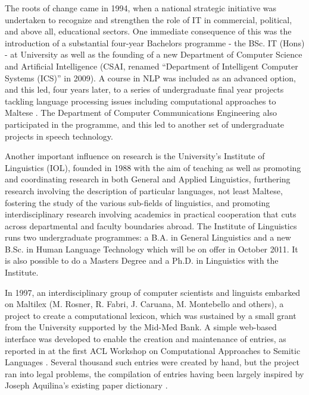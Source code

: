 \documentclass[]{../../metanetpaper}
\begin{document}
\begin{multicols}{2}
The roots of change came in 1994, when a national strategic initiative was undertaken to recognize and strengthen the role of IT in commercial, political, and above all, educational sectors. One immediate consequence of this was the introduction of a substantial four-year Bachelors programme - the BSc. IT (Hons) - at University as well as the founding of a new Department of Computer Science and Artificial Intelligence (CSAI, renamed ``Department of Intelligent Computer Systems (ICS)'' in 2009). A course in NLP was included as an advanced option, and this led, four years later, to a series of undergraduate final year projects tackling language processing issues including computational approaches to Maltese \cite{Galea:1999, Mangion:1999, Farrugia:1999, Farrugia:2000, Mizzi:2000, Bajada:2004, Attard:2005, Farrugia:2008, Farrugia:2009, Vella:2010}. The Department of Computer Communications Engineering also participated in the programme, and this led to another set of undergraduate projects in speech technology.

Another important influence on research is the University’s Institute of Linguistics (IOL), founded in 1988 with the aim of teaching as well as promoting and coordinating research in both General and Applied Linguistics, furthering research involving the description of particular languages, not least Maltese, fostering the study of the various sub-fields of linguistics, and promoting interdisciplinary research involving academics in practical cooperation that cuts across departmental and faculty boundaries abroad. The Institute of Linguistics runs two undergraduate programmes: a B.A. in General Linguistics and a new B.Sc. in Human Language Technology which will be on offer in October 2011. It is also possible to do a Masters Degree and a Ph.D. in Linguistics with the Institute.

In 1997, an interdisciplinary group of computer scientists and linguists  embarked on Maltilex (M. Rosner, R. Fabri, J. Caruana, M. Montebello and others), a project to create a computational lexicon, which was sustained by a small grant from the University supported by the Mid-Med Bank. A simple web-based interface was developed to enable the creation and maintenance of entries, as reported in \cite{Rosner-et-al:1998} at the first ACL Workshop on Computational Approaches to Semitic Languages \cite{Rosner:1998}. Several thousand such entries were created by hand, but the project ran into legal problems, the compilation of entries having been largely inspired by Joseph Aquilina's existing paper dictionary \cite{Aquilina:1987,Aquilina:1990}.


\end{multicols}
\end{document}
